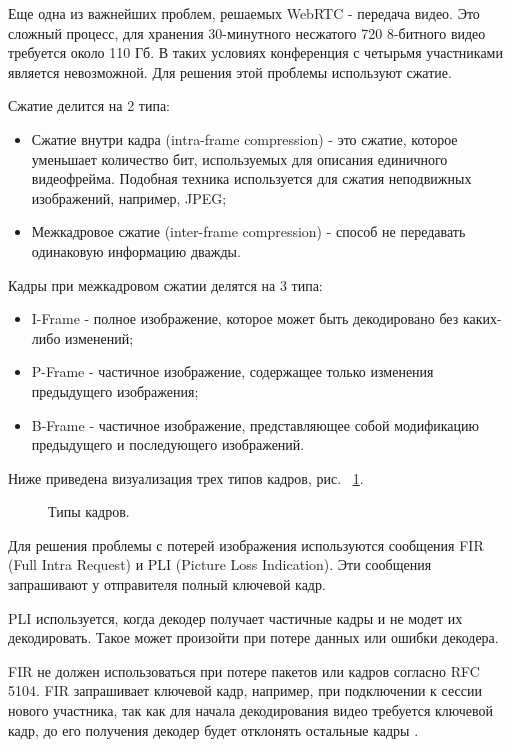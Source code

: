 
Еще одна из важнейших проблем, решаемых WebRTC - передача видео. Это сложный процесс, для хранения 30-минутного несжатого 720 8-битного видео требуется около 110 Гб. В таких условиях конференция с четырьмя участниками является невозможной. Для решения этой проблемы используют сжатие.

Сжатие делится на 2 типа:
\begin{itemize}
	\item[1.] Сжатие внутри кадра (intra-frame compression) - это сжатие, которое уменьшает количество бит, используемых для описания единичного видеофрейма. Подобная техника используется для сжатия неподвижных изображений, например, JPEG;
	\item[2.] Межкадровое сжатие (inter-frame compression) - способ не передавать одинаковую информацию дважды.
\end{itemize}

Кадры при межкадровом сжатии делятся на 3 типа:
\begin{itemize}
	\item[--] I-Frame - полное изображение, которое может быть декодировано без каких-либо изменений;
	\item[--] P-Frame - частичное изображение, содержащее только изменения предыдущего изображения;
        \item[--] B-Frame - частичное изображение, представляющее собой модификацию предыдущего и последующего изображений.
\end{itemize}

Ниже приведена визуализация трех типов кадров, рис. ~\ref{frame-types}.

\begin{figure}[ht]
\begin{center}

\caption{
\label{frame-types}
     Типы кадров.}
\end {center}
\end {figure}


Для решения проблемы с потерей изображения используются сообщения FIR (Full Intra Request) и PLI (Picture Loss Indication). Эти сообщения запрашивают у отправителя полный ключевой кадр.

PLI используется, когда декодер получает частичные кадры и не модет их декодировать. Такое может произойти при потере данных или ошибки декодера.

FIR не должен использоваться при потере пакетов или кадров согласно RFC 5104. FIR запрашивает ключевой кадр, например, при подключении к сессии нового участника, так как для начала декодирования видео требуется ключевой кадр, до его получения декодер будет отклонять остальные кадры \cite{v16}.

\pagebreak